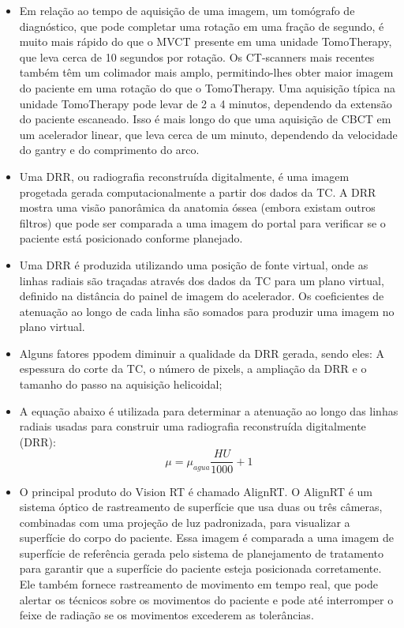 \documentclass[11pt,a4paper]{article}
\newcounter{exemplo}
\begin{document}
\begin{exemplo}[IGRT]
\begin{itemize}
        \item Em relação ao tempo de aquisição de uma imagem, um tomógrafo de diagnóstico, que pode completar uma rotação em uma fração de segundo, é muito mais rápido do que o MVCT presente em uma unidade TomoTherapy, que leva cerca de 10 segundos por rotação. Os CT-scanners mais recentes também têm um colimador mais amplo, permitindo-lhes obter maior imagem do paciente em uma rotação do que o TomoTherapy. Uma aquisição típica na unidade TomoTherapy pode levar de 2 a 4 minutos, dependendo da extensão do paciente escaneado. Isso é mais longo do que uma aquisição de CBCT em um acelerador linear, que leva cerca de um minuto, dependendo da velocidade do gantry e do comprimento do arco.
        
        \item Uma DRR, ou radiografia reconstruída digitalmente, é uma imagem progetada gerada computacionalmente a partir dos dados da TC. A DRR mostra uma visão panorâmica da anatomia óssea (embora existam outros filtros) que pode ser comparada a uma imagem do portal para verificar se o paciente está posicionado conforme planejado.
        
        \item Uma DRR é produzida utilizando uma posição de fonte virtual, onde as linhas radiais são traçadas através dos dados da TC para um plano virtual, definido na distância do painel de imagem do acelerador. Os coeficientes de atenuação ao longo de cada linha são somados para produzir uma imagem no plano virtual.
        
        \item Alguns fatores ppodem diminuir a qualidade da DRR gerada, sendo eles: A espessura do corte da TC, o número de pixels, a ampliação da DRR e o tamanho do passo na aquisição helicoidal;
        
        \item A equação abaixo é utilizada para determinar a atenuação ao longo das linhas radiais usadas para construir uma radiografia reconstruída digitalmente (DRR): 
            $$\mu = \mu_{agua}\frac{HU}{1000} + 1$$
        
        \item O principal produto do Vision RT é chamado AlignRT. O AlignRT é um sistema óptico de rastreamento de superfície que usa duas ou três câmeras, combinadas com uma projeção de luz padronizada, para visualizar a superfície do corpo do paciente. Essa imagem é comparada a uma imagem de superfície de referência gerada pelo sistema de planejamento de tratamento para garantir que a superfície do paciente esteja posicionada corretamente. Ele também fornece rastreamento de movimento em tempo real, que pode alertar os técnicos sobre os movimentos do paciente e pode até interromper o feixe de radiação se os movimentos excederem as tolerâncias.
        

\end{itemize}
\end{exemplo}
\end{document}
